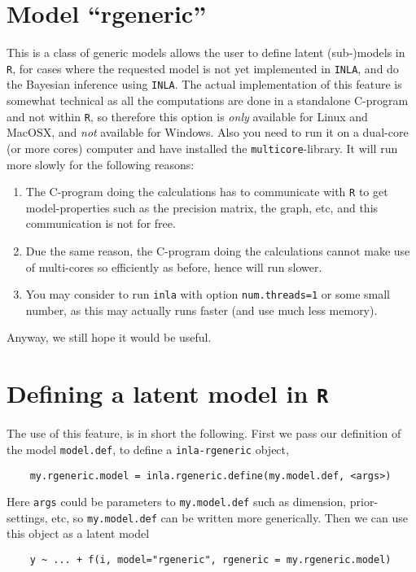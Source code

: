 \documentclass[a4paper,11pt]{article}
\begin{document}
\section*{Model ``rgeneric''}


This is a class of generic models allows the user to define latent
(sub-)models in \texttt{R}, for cases where the requested model is not
yet implemented in \texttt{INLA}, and do the Bayesian inference using
\texttt{INLA}. 
The actual implementation of this feature is somewhat technical as all
the computations are done in a standalone C-program and not within
\texttt{R}, so therefore this option is \emph{only} available for
Linux and MacOSX, and \emph{not} available for Windows. Also you need
to run it on a dual-core (or more cores) computer and have installed
the \texttt{multicore}-library. It will run more slowly for the
following reasons:
\begin{enumerate}
\item The C-program doing the calculations has to communicate with
    \texttt{R} to get model-properties such as the precision matrix,
    the graph, etc, and this communication is not for free.
\item Due the same reason, the C-program doing the calculations cannot
    make use of multi-cores so efficiently as before, hence will run
    slower.
\item You may consider to run \texttt{inla} with option
    \texttt{num.threads=1} or some small number, as this may actually
    runs faster (and use much less memory).
\end{enumerate}
Anyway, we still hope it would be useful.

\section*{Defining a latent model in \texttt{R}}

The use of this feature, is in short the following. First we pass our
definition of the model \texttt{model.def}, to define a
\texttt{inla-rgeneric} object,
\begin{verbatim}
    my.rgeneric.model = inla.rgeneric.define(my.model.def, <args>)
\end{verbatim}
Here \texttt{args} could be parameters to \texttt{my.model.def}
such as dimension, prior-settings, etc, so \texttt{my.model.def} can
be written more generically.  Then we can use this object as a latent
model
\begin{verbatim}
    y ~ ... + f(i, model="rgeneric", rgeneric = my.rgeneric.model)
\end{verbatim}
\end{document}
